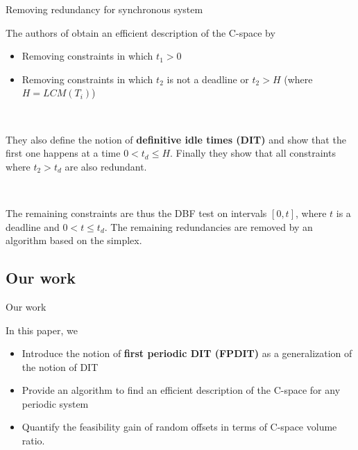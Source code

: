 \documentclass{beamer}
\begin{document}
    \begin{frame}{Removing redundancy for synchronous system}

    The authors of \cite{george2009characterization} obtain an efficient description of the C-space by
    \begin{itemize}
        \item Removing constraints in which $t_1 > 0$
        \item Removing constraints in which $t_2$ is not a deadline or $t_2 > H$ (where $H = LCM(T_i)$)
    \end{itemize}

    ~\\
    \pause

    They also define the notion of \textbf{definitive idle times (DIT)} and show that the first one happens at a time $0 < t_d \leqslant H$. Finally they show that all constraints where $t_2 > t_d$ are also redundant.

    ~\\
    \pause

    The remaining constraints are thus the DBF test on intervals $[0, t]$, where $t$ is a deadline and $0 < t \leqslant t_d$. The remaining redundancies are removed by an algorithm based on the simplex.

    \end{frame}




	\subsection{Our work}

	\begin{frame}{Our work}

	In this paper, we
    \begin{itemize}
        \item Introduce the notion of \textbf{first periodic DIT (FPDIT)} as a generalization of the notion of DIT
        \item Provide an algorithm to find an efficient description of the C-space for any periodic system
        \item Quantify the feasibility gain of random offsets in terms of C-space volume ratio.
    \end{itemize}

	\end{frame}
\end{document}
